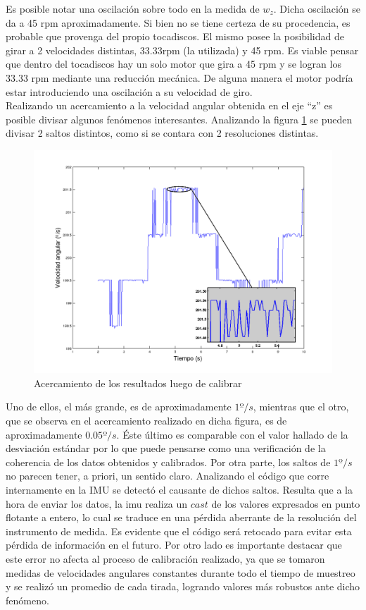 \documentclass[main]{subfiles}
\begin{document}
Es posible notar una oscilación sobre todo en la medida de $w_z$. Dicha oscilación se da a 45 rpm aproximadamente. Si bien no se tiene certeza de su procedencia, es probable que provenga del propio tocadiscos. El mismo posee la posibilidad de girar a 2 velocidades distintas, 33.33rpm (la utilizada) y 45 rpm. Es viable pensar que dentro del tocadiscos hay un solo motor que gira a 45 rpm y se logran los 33.33 rpm mediante una reducción mecánica. De alguna manera el motor podría estar introduciendo una oscilación a su velocidad de giro.\\

Realizando un acercamiento a la velocidad angular obtenida en el eje ``z'' es posible divisar algunos fenómenos interesantes. Analizando la figura \ref{fig:wcalibradocerca} se pueden divisar 2 saltos distintos, como si se contara con 2 resoluciones distintas.

\begin{figure}[h!]
	\centering
	\includegraphics[width=.8\textwidth]{./pics_gyro/wcalibradocerca.png}
	\caption{Acercamiento de los resultados luego de calibrar}
	\label{fig:wcalibradocerca}
\end{figure}

Uno de ellos, el más grande, es de aproximadamente $1 º/s$, mientras que el otro, que se observa en el acercamiento realizado en dicha figura, es de aproximadamente $0.05º/s$. Éste último es comparable con el valor hallado de la desviación estándar por lo que puede pensarse como una verificación de la coherencia de los datos obtenidos y calibrados. Por otra parte, los saltos de $1º/s$ no parecen tener, a priori, un sentido claro. Analizando el código que corre internamente en la IMU se detectó el causante de dichos saltos. Resulta que a la hora de enviar los datos, la imu realiza un $cast$ de los valores expresados en punto flotante a entero, lo cual se traduce en una pérdida aberrante de la resolución del instrumento de medida. Es evidente que el código será retocado para evitar esta pérdida de información en el futuro. Por otro lado es importante destacar que este error no afecta al proceso de calibración realizado, ya que se tomaron medidas de velocidades angulares constantes durante todo el tiempo de muestreo y se realizó un promedio de cada tirada, logrando valores más robustos ante dicho fenómeno.
\end{document}
